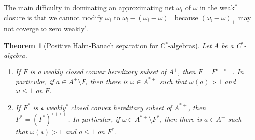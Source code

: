 \documentclass[a4paper]{amsart}
\theoremstyle{plain}
\newtheorem{thm}{Theorem}[section]
\theoremstyle{definition}
\begin{document}
The main difficulty in dominating an approximating net $\omega_i$ of $\omega$ in the weak$^*$ closure is that we cannot modify $\omega_i$ to $\omega_i-(\omega_i-\omega)_+$ because $(\omega_i-\omega)_+$ may not coverge to zero weakly$^*$.


\begin{thm}[Positive Hahn-Banach separation for C$^*$-algebras]
Let $A$ be a C$^*$-algebra.
\begin{enumerate}
\item If $F$ is a weakly closed convex hereditary subset of $A^+$, then $F=F^{\circ+\circ+}$. In particular, if $a\in A^+\setminus F$, then there is $\omega\in A^{*+}$ such that $\omega(a)>1$ and $\omega\le1$ on $F$.
\item If $F^*$ is a weakly$^*$ closed convex hereditary subset of $A^{*+}$, then $F^*=(F^*)^{\circ+\circ+}$. In particular, if $\omega\in A^{*+}\setminus F^*$, then there is $a\in A^+$ such that $\omega(a)>1$ and $a\le1$ on $F^*$.
\end{enumerate}
\end{thm}
\end{document}
